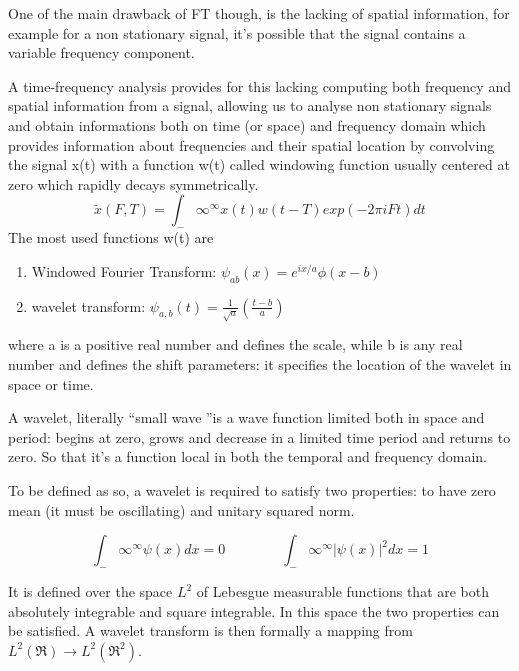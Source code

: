 \documentclass[a4paper,11pt]{article}
\begin{document}
One of the main drawback of FT though, is the lacking of spatial information, for example for a non stationary signal, it's possible that the signal contains a variable frequency component.

A time-frequency analysis provides for this lacking computing both frequency and spatial information from a signal, allowing us to analyse non stationary signals and obtain informations both on time (or space) and frequency domain which provides information about frequencies and their spatial location by convolving the signal x(t) with a function w(t) called windowing function usually centered at zero which rapidly decays symmetrically.
\begin{equation}
\tilde{x}(F, T) = \int_-\infty ^\infty x(t)w(t-T) exp(-2\pi i F t) dt
\end{equation}
The most used functions w(t) are
\begin{enumerate}
\item Windowed Fourier Transform: $\psi_{ab}(x) = e^{ix/a}\phi(x-b)$
\item wavelet transform: $\psi_{a, b}\left(t\right) = \frac{1}{\sqrt{a}}\left(\frac{t-b}{a}\right)$
\end{enumerate}

where a is a positive real number and defines the scale, while b is any real number and defines the shift parameters: it specifies the location of the wavelet in space or time.

A wavelet, literally \textquotedblleft small wave \textquotedblright is a wave function limited both in space and period: begins at zero, grows and decrease in a limited time period and returns to zero. So that it's a function local in both the temporal and frequency domain.

To be defined as so, a wavelet is required to satisfy two properties: to have zero mean (it must be oscillating) and unitary squared norm.

\begin{equation}\label{eq:waveletproperties}
\int_-\infty^\infty\psi(x)dx = 0 \qquad \qquad  \int_-\infty^\infty |\psi(x)|^2 dx = 1
\end{equation}

It is defined over the space $L^2$ of Lebesgue measurable functions that are both absolutely integrable and square integrable. In this space the two properties can be satisfied. A wavelet transform is then formally a mapping from $L^2(\Re) \rightarrow L^2(\Re^2)$.
\end{document}
